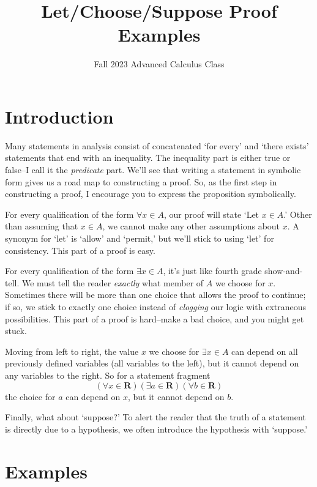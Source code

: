 \documentclass[12pt,fleqn,answers]{exam}
\title{Let/Choose/Suppose Proof Examples}
\author{Fall 2023 Advanced Calculus Class}
\newcommand{\reals}{\mathbf{R}}
\begin{document}
\maketitle

\section{Introduction}
Many statements in analysis consist of concatenated `for every' and `there exists' 
statements that end with an inequality. The inequality part is either true or 
false--I call it the \emph{predicate} part. We'll see that writing a statement in 
symbolic form gives us a road map to constructing a proof. So, as the 
first step in constructing a proof, I encourage you to express the proposition 
symbolically.

For every qualification of the form $\forall x \in A$, our proof will state 
`Let $x \in A$.' Other than assuming that $x \in A$, we cannot make any other 
assumptions about $x$. A synonym for `let' is `allow' and `permit,'  but we'll 
stick to using `let' for consistency.  This part of a proof is easy.

For every qualification of the form $\exists x \in A$, it's just like fourth 
grade show-and-tell. We must tell the reader \emph{exactly} what member of $A$ 
we choose for $x$.  Sometimes there will be more than one choice that allows 
the proof to continue; if so, we stick to exactly one choice instead of 
\emph{clogging} our logic with extraneous possibilities.  This part of
a proof is hard--make a bad choice, and you might get stuck. 

Moving from left to right, the value $x$ we choose for  $\exists x \in A$ can 
depend on all previously defined variables (all variables to the left), but 
it cannot depend on any variables to the right. So for a  statement fragment
\begin{equation*}
    \left(\forall x \in \reals \right) \left(\exists a \in \reals\right) \left(\forall b \in \reals\right) 
\end{equation*}
the choice for $a$ can depend on $x$, but it cannot depend on $b$.

Finally, what about `suppose?' To alert the reader that 
the truth of a statement is directly due to a hypothesis, we often
introduce the hypothesis with `suppose.'

\section{Examples}
\end{document}
